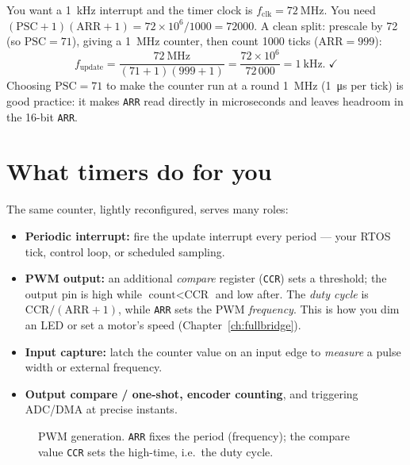\documentclass[11pt,a4paper,oneside]{book}
\newcommand{\code}[1]{\texttt{#1}}
\begin{document}
\begin{wexample}
You want a \qty{1}{\kilo\hertz} interrupt and the timer clock is
$f_{\text{clk}}=\qty{72}{\mega\hertz}$. You need
$(\text{PSC}+1)(\text{ARR}+1) = 72\times10^6 / 1000 = \num{72000}$.
A clean split: prescale by 72 (so $\text{PSC}=71$), giving a \qty{1}{\mega\hertz}
counter, then count 1000 ticks ($\text{ARR}=999$):
\[
f_{\text{update}} = \frac{\qty{72}{\mega\hertz}}{(71+1)(999+1)}
   = \frac{72\times10^6}{72\,000} = \qty{1}{\kilo\hertz}.\;\checkmark
\]
Choosing $\text{PSC}=71$ to make the counter run at a round \qty{1}{\mega\hertz}
(\qty{1}{\micro\second} per tick) is good practice: it makes \code{ARR} read
directly in microseconds and leaves headroom in the 16-bit \code{ARR}.
\end{wexample}

\section{What timers do for you}
The same counter, lightly reconfigured, serves many roles:
\begin{itemize}[leftmargin=1.4cm]
  \item \textbf{Periodic interrupt:} fire the update interrupt every period ---
        your RTOS tick, control loop, or scheduled sampling.
  \item \textbf{PWM output:} an additional \emph{compare} register (\code{CCR})
        sets a threshold; the output pin is high while $\text{count}<\text{CCR}$
        and low after. The \emph{duty cycle} is $\text{CCR}/(\text{ARR}+1)$,
        while \code{ARR} sets the PWM \emph{frequency}. This is how you dim an
        LED or set a motor's speed (Chapter~\ref{ch:fullbridge}).
  \item \textbf{Input capture:} latch the counter value on an input edge to
        \emph{measure} a pulse width or external frequency.
  \item \textbf{Output compare / one-shot, encoder counting}, and triggering
        ADC/DMA at precise instants.
\end{itemize}

\begin{figure}[h]
\centering
{}
\caption{PWM generation. \code{ARR} fixes the period (frequency); the compare
value \code{CCR} sets the high-time, i.e.\ the duty cycle.}
\label{fig:pwm}
\end{figure}
\end{document}
